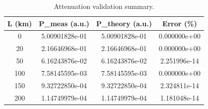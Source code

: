 \begin{table}[!ht]
  \caption{Attenuation validation summary.}
  \label{tab:attenuation}
  \centering
  \begin{tabular}{c c c c}
    \toprule
    L (km) & P\_meas (a.u.) & P\_theory (a.u.) & Error (\%) \\
    \midrule
    0 & 5.00901828e-01 & 5.00901828e-01 & 0.000000e+00 \\
    20 & 2.16646968e-01 & 2.16646968e-01 & 0.000000e+00 \\
    50 & 6.16243876e-02 & 6.16243876e-02 & 2.251996e-14 \\
    100 & 7.58145595e-03 & 7.58145595e-03 & 0.000000e+00 \\
    150 & 9.32722850e-04 & 9.32722850e-04 & 2.324811e-14 \\
    200 & 1.14749979e-04 & 1.14749979e-04 & 1.181048e-14 \\
    \bottomrule
  \end{tabular}
\end{table}
